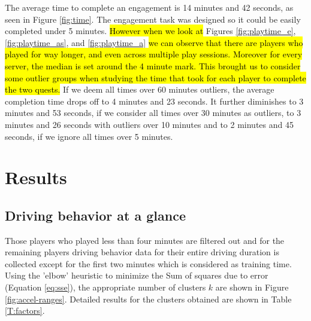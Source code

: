 \documentclass[preprint,authoryear,12pt]{elsarticle}
\newcommand{\hlc}[2][yellow]{ {\sethlcolor{#1} \hl{#2}} }
\begin{document}
The average time to complete an engagement is 14 minutes and 42 seconds, as seen in Figure \ref{fig:time}.
The engagement task was designed so it could be easily completed under 5 minutes.
\hlc[green]{However when we look at} Figures \ref{fig:playtime_e}, \ref{fig:playtime_as}, and \ref{fig:playtime_a}
\hlc[green]{we can observe that there are players who played for way longer, and even across multiple play sessions. Moreover for every server, the median is set around the 4 minute mark. This brought us to consider some outlier groups when studying the time that took for each player to complete the two quests.}
If we deem all times over 60 minutes outliers, the average completion time drops off to 4 minutes and 23 seconds. It further diminishes to 3 minutes and 53 seconds, if we consider all times over 30 minutes as outliers, to 3 minutes and 26 seconds with outliers over 10 minutes and to 2 minutes and 45 seconds, if we ignore all times over 5 minutes.

\section{Results}
\label{subsec:result}

\subsection{Driving behavior at a glance}

Those players who played less than four minutes are filtered out and for the remaining players driving behavior data for their entire driving duration is collected except for the first two minutes which is considered as training time.
Using the 'elbow' heuristic to minimize the Sum of squares due to error (Equation \ref{eq:sse}), the appropriate number of clusters $k$ are shown in Figure \ref{fig:accel-ranges}. Detailed results for the clusters obtained are shown in Table \ref{T:factors}.
\end{document}
